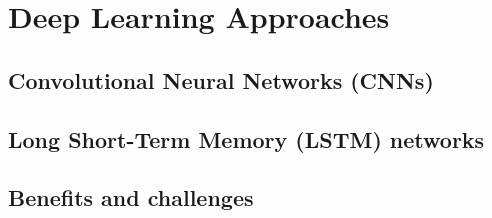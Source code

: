 
\chapter{Deep Learning Approaches}
\label{cha:Deep Learning Approaches}

\section{Convolutional Neural Networks (CNNs)}
\label{sec:Convolutional Neural Networks (CNNs)}

\section{Long Short-Term Memory (LSTM) networks}
\label{sec:Long Short-Term Memory (LSTM) networks}

\section{Benefits and challenges}
\label{sec:Benefits and challenges}